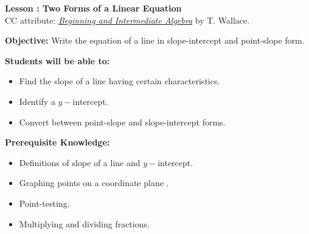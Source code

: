 \documentclass[12pt]{article}
\theoremstyle{definition}
\begin{document}
{\bf \large Lesson : Two Forms of a Linear Equation}\label{les:two_forms_of_a_linear_equation}\\
CC attribute: \href{http://www.wallace.ccfaculty.org/book/book.html}{\it{Beginning and Intermediate Algebra}} by T. Wallace. \hfill \doclicenseImage[imagewidth=5em]\\
\par
{\bf Objective:} Write the equation of a line in slope-intercept and point-slope form.\\
\par
{\bf Students will be able to:}
\begin{itemize}
	\item Find the slope of a line having certain characteristics.
	\item Identify a $y-$intercept.
	\item Convert between point-slope and slope-intercept forms.
\end{itemize}
{\bf Prerequisite Knowledge:}
\begin{itemize}
	\item Definitions of slope of a line and $y-$intercept.
	\item Graphing points on a coordinate plane .
	\item Point-testing.
	\item Multiplying and dividing fractions.
\end{itemize}
\hrulefill
\end{document}
